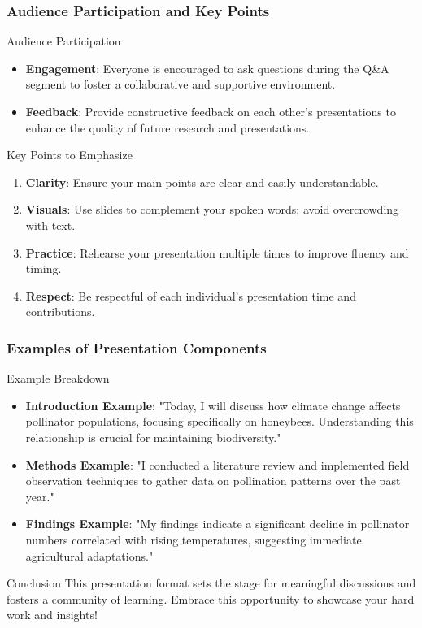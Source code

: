 \documentclass[aspectratio=169]{beamer}
\begin{document}
\begin{frame}[fragile]
  \frametitle{Audience Participation and Key Points}
  \begin{block}{Audience Participation}
    \begin{itemize}
      \item \textbf{Engagement}: Everyone is encouraged to ask questions during the Q\&A segment to foster a collaborative and supportive environment.
      \item \textbf{Feedback}: Provide constructive feedback on each other's presentations to enhance the quality of future research and presentations.
    \end{itemize}
  \end{block}
  
  \begin{block}{Key Points to Emphasize}
    \begin{enumerate}
      \item \textbf{Clarity}: Ensure your main points are clear and easily understandable.
      \item \textbf{Visuals}: Use slides to complement your spoken words; avoid overcrowding with text.
      \item \textbf{Practice}: Rehearse your presentation multiple times to improve fluency and timing.
      \item \textbf{Respect}: Be respectful of each individual’s presentation time and contributions.
    \end{enumerate}
  \end{block}
\end{frame}

\begin{frame}[fragile]
  \frametitle{Examples of Presentation Components}
  \begin{block}{Example Breakdown}
    \begin{itemize}
      \item \textbf{Introduction Example}: "Today, I will discuss how climate change affects pollinator populations, focusing specifically on honeybees. Understanding this relationship is crucial for maintaining biodiversity."
      \item \textbf{Methods Example}: "I conducted a literature review and implemented field observation techniques to gather data on pollination patterns over the past year."
      \item \textbf{Findings Example}: "My findings indicate a significant decline in pollinator numbers correlated with rising temperatures, suggesting immediate agricultural adaptations."
    \end{itemize}
  \end{block}
  
  \begin{block}{Conclusion}
    This presentation format sets the stage for meaningful discussions and fosters a community of learning. Embrace this opportunity to showcase your hard work and insights!
  \end{block}
\end{frame}
\end{document}
